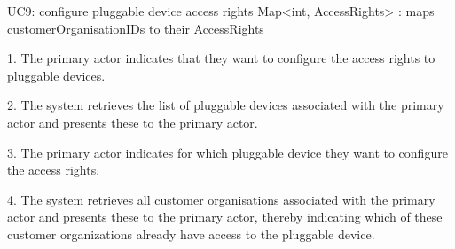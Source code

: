         UC9: configure pluggable device access rights
            Map<int, AccessRights> : maps customerOrganisationIDs to their AccessRights

            1. The primary actor indicates that they want to configure the access rights to pluggable devices.

            2. The system retrieves the list of pluggable devices associated with the primary actor and presents these to the primary actor.

            3. The primary actor indicates for which pluggable device they want to configure the access rights.

            4. The system retrieves all customer organisations associated with the primary actor and presents these to the primary actor,
               thereby indicating which of these customer organizations already have access to the pluggable device.


